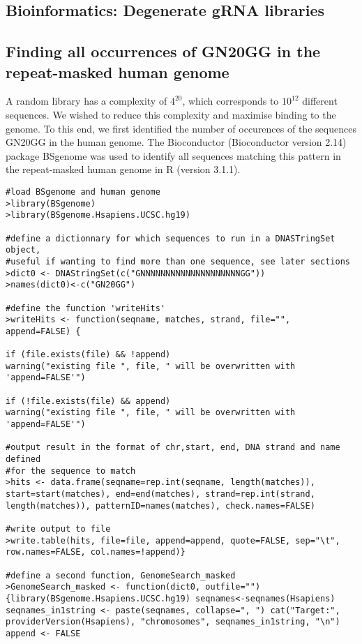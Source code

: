 \begin{footnotesize}

\section{Bioinformatics: Degenerate gRNA libraries}

\subsection{Finding all occurrences of GN20GG in the repeat-masked human genome}
\label{sec:GN20GG in genome}

A random library has a complexity of $4^{20}$, which corresponds to $10^{12}$ different sequences. We wished to reduce this complexity and maximise binding to the genome. To this end, we first identified the number of occurences of the sequences GN20GG in the human genome. The Bioconductor (Bioconductor version 2.14) package BSgenome \citep{BSgenome} was used to identify all sequences matching this pattern in the repeat-masked human genome in R (version 3.1.1).

\begin{lstlisting}
#load BSgenome and human genome
>library(BSgenome)
>library(BSgenome.Hsapiens.UCSC.hg19) 

#define a dictionnary for which sequences to run in a DNASTringSet object,
#useful if wanting to find more than one sequence, see later sections
>dict0 <- DNAStringSet(c("GNNNNNNNNNNNNNNNNNNNNGG"))
>names(dict0)<-c("GN20GG")

#define the function 'writeHits'
>writeHits <- function(seqname, matches, strand, file="", append=FALSE) {

if (file.exists(file) && !append)
warning("existing file ", file, " will be overwritten with 'append=FALSE'")

if (!file.exists(file) && append)
warning("existing file ", file, " will be overwritten with 'append=FALSE'")

#output result in the format of chr,start, end, DNA strand and name defined 
#for the sequence to match 
>hits <- data.frame(seqname=rep.int(seqname, length(matches)), start=start(matches), end=end(matches), strand=rep.int(strand, length(matches)), patternID=names(matches), check.names=FALSE)

#write output to file
>write.table(hits, file=file, append=append, quote=FALSE, sep="\t", row.names=FALSE, col.names=!append)}

#define a second function, GenomeSearch_masked
>GenomeSearch_masked <- function(dict0, outfile=""){library(BSgenome.Hsapiens.UCSC.hg19) seqnames<-seqnames(Hsapiens) seqnames_in1string <- paste(seqnames, collapse=", ") cat("Target:", providerVersion(Hsapiens), "chromosomes", seqnames_in1string, "\n") append <- FALSE


\end{lstlisting}
\end{footnotesize}
